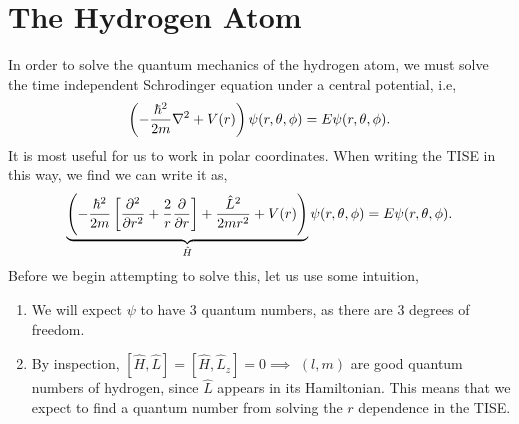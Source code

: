 \documentclass{book}
\begin{document}
\chapter{The Hydrogen Atom}
In order to solve the quantum mechanics of the hydrogen atom, we must solve the time independent Schrodinger equation under a central potential, i.e,
\begin{equation}
	\left(-\frac{\hbar^2}{2m}\laplacian + V(r)\right)\psi(r, \theta, \phi) = E \psi(r, \theta, \phi).
\end{equation} 
It is most useful for us to work in polar coordinates. When writing the TISE in this way, we find we can write it as,
\begin{equation}
	\underbrace{\left(-\frac{\hbar^2}{2m}\left[\pdv[2]{r} + \frac{2}{r}\pdv{r}\right] + \frac{\hat{L}^2}{2mr^2}+V(r)\right)}_{\hat{H}}\psi(r,\theta,\phi) = E\psi(r,\theta,\phi). \label{eq:hyd}
\end{equation}
Before we begin attempting to solve this, let us use some intuition,
\begin{enumerate}
	\item We will expect $\psi$ to have 3 quantum numbers, as there are 3 degrees of freedom.
	\item By inspection, $\left[\hat{H},\hat{L}\right] = \left[\hat{H},\hat{L}_z\right] = 0 \implies$ $(l,m)$ are good quantum numbers of hydrogen, since $\hat{L}$ appears in its Hamiltonian. This means that we expect to find a quantum number from solving the $r$ dependence in the TISE.
\end{enumerate}
\end{document}
